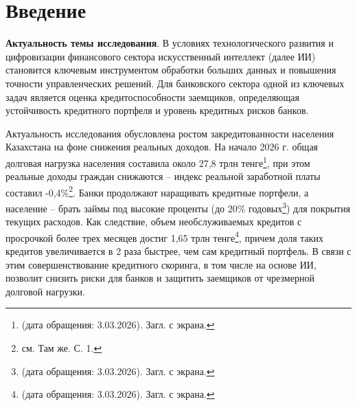 \section*{\centering Введение} %
	
	\textbf{Актуальность темы исследования}. В условиях технологического развития и цифровизации финансового сектора искусственный интеллект (далее ИИ) становится ключевым инструментом обработки больших данных и повышения точности управленческих решений. Для банковского сектора одной из ключевых задач является оценка кредитоспособности заемщиков, определяющая устойчивость кредитного портфеля и уровень кредитных рисков банков.
	
	Актуальность исследования обусловлена ростом закредитованности населения Казахстана на фоне снижения реальных доходов. На начало 2026 г. общая долговая нагрузка населения составила около 27,8 трлн тенге\footnote{\cite{Zakonkz} (дата обращения: 3.03.2026). Загл. с экрана.}, при этом реальные доходы граждан снижаются -- индекс реальной заработной платы составил -0,4\%\footnote{см. Там же. С. 1.}.  Банки продолжают наращивать кредитные портфели, а население -- брать займы под высокие проценты (до 20\% годовых\footnote{\cite{Kursiv} (дата обращения: 3.03.2026). Загл. с экрана.}) для покрытия текущих расходов. Как следствие, объем необслуживаемых кредитов с просрочкой более трех месяцев достиг 1,65 трлн тенге\footnote{\cite{Kursiv2} (дата обращения: 3.03.2026). Загл. с экрана.}, причем доля таких кредитов увеличивается в 2 раза быстрее, чем сам кредитный портфель. В связи с этим совершенствование кредитного скоринга, в том числе на основе ИИ, позволит снизить риски для банков и защитить заемщиков от чрезмерной долговой нагрузки.
	
	
